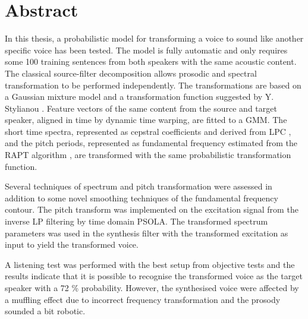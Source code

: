 % 
\chapter*{Abstract} %
\label{cha:abstract}
	In this thesis, a probabilistic model for transforming a voice to sound like another specific voice has been tested. The model is fully automatic and only requires some 100 training sentences from both speakers with the same acoustic content. The classical source-filter decomposition allows prosodic and spectral transformation to be performed independently. The transformations are based on a Gaussian mixture model and a transformation function suggested by Y. Stylianou \cite{stylianou98}. Feature vectors of the same content from the source and target speaker, aligned in time by dynamic time warping, are fitted to a GMM. The short time spectra, represented as cepstral coefficients and derived from LPC \cite{atal68}, and the pitch periods, represented as fundamental frequency estimated from the RAPT algorithm \cite{talkin95}, are transformed with the same probabilistic transformation function.

Several techniques of spectrum and pitch transformation were assessed in addition to some novel smoothing techniques of the fundamental frequency contour. The pitch transform was implemented on the excitation signal from the inverse LP filtering by time domain PSOLA. The transformed spectrum parameters was used in the synthesis filter with the transformed excitation as input to yield the transformed voice.

	A listening test was performed with the best setup from objective tests and the results indicate that it is possible to recognise the transformed voice as the target speaker with a 72 \% probability. However, the synthesised voice were affected by a muffling effect due to incorrect frequency transformation and the prosody sounded a bit robotic.


